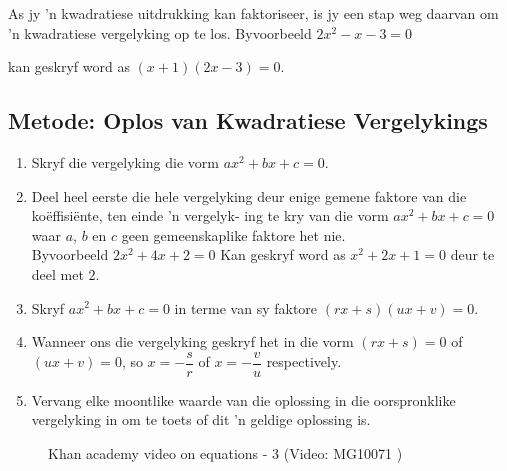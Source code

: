 As jy ’n kwadratiese uitdrukking kan faktoriseer, is jy een stap weg daarvan om ’n kwadratiese vergelyking op
te los. Byvoorbeeld $2{x}^{2}-x-3 = 0$

kan geskryf word as $(x+1)(2x-3)=0$.


\subsection*{Metode: Oplos van Kwadratiese Vergelykings}
\begin{enumerate}[noitemsep, label=\textbf{\arabic*}. ] 
\item Skryf die vergelyking die vorm $ax^{2} +bx +c =0$.
\item Deel heel eerste die hele vergelyking deur enige gemene faktore van die koëffisiënte, ten einde ’n vergelyk-
ing te kry van die vorm $a{x}^{2}+bx+c=0$ waar $a$, $b$ en
$c$ geen gemeenskaplike faktore het nie.
\\Byvoorbeeld $2{x}^{2}+4x+2=0$ Kan geskryf word as
${x}^{2}+2x+1=0$ deur te deel met $2$.
\item Skryf $a{x}^{2}+bx+c=0$ in terme van sy faktore  $(rx+s)(ux+v)=0$.

\item Wanneer ons die vergelyking geskryf het in die vorm  $(rx+s)=0$ of $(ux+v)=0$, so $x = -\dfrac{s}{r}$ of $x=-\dfrac{v}{u}$ respectively.
\item Vervang elke moontlike waarde van die oplossing in die oorspronklike vergelyking in om te toets of dit ’n
geldige oplossing is.

\end{enumerate}

\setcounter{subfigure}{0}
\begin{figure}[H] %
\textnormal{Khan academy video on equations - 3}\vspace{.1in} \nSolve 
\label{m39247*yt-media3}\label{m39247*yt-video3}
 { (Video:  MG10071 )}
\vspace{2pt}
\vspace{.1in}
\end{figure}

